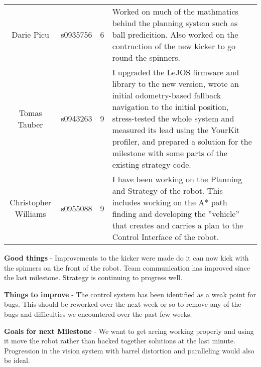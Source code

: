 \documentclass[10pt, a4paper]{article} %
\begin{document}
\begin{longtable}{c c c p{16cm}}
    Darie Picu &
    s0935756 &
    6&
    Worked on much of the mathmatics behind the planning system such as ball
    predicition. Also worked on the contruction of the new kicker to go round
    the spinners.\\

    Tomas Tauber &
    s0943263 &
    9&
    I upgraded the LeJOS firmware and library to the new version, wrote an
    initial odometry-based fallback navigation to the initial position,
    stress-tested the whole system and measured its lead using the YourKit
    profiler, and prepared a solution for the milestone with some parts of the
    existing strategy code.\\

    Christopher Williams &
    s0955088 &
    9&
    I have been working on the Planning and Strategy of the robot. This
    includes working on the A* path finding and developing the ”vehicle” that
    creates and carries a plan to the Control Interface of the robot. \\


\end{longtable}
\textbf{Good things} - Improvements to the kicker were made do it can now kick
with the spinners on the front of the robot. Team communication has improved
since the last milestone. Strategy is continuing to progress well.

\textbf{Things to improve} - The control system has been identified as a weak
point for bugs. This should be reworked over the next week or so to remove any
of the bugs and difficulties we encountered over the past few weeks.

\textbf{Goals for next Milestone} - We want to get arcing working properly and
using it move the robot rather than hacked together solutions at the last
minute. Progression in the vision system with barrel distortion and paralleling
would also be ideal.
\end{document}
